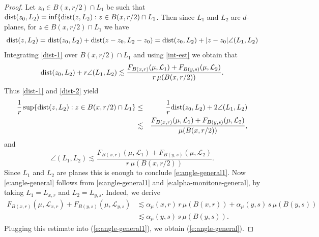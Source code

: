 \documentclass[11pt]{amsart}
\newcommand{\LL}{{\mathcal L}}
\newcommand{\dist}{{\rm dist}}
\newcommand{\rf}[1]{{(\ref{#1})}}
\theoremstyle{definition}
\theoremstyle{remark}
\numberwithin{equation}{section}
\def\lec{\lesssim}
\def\lec{\lesssim}
\begin{document}
\begin{proof}
	Let $z_0\in B(x,r/2)\cap L_1$ be such that $\dist(z_0,L_2)=\inf\{\dist(z,L_2):z\in B(x,r/2)\cap L_1$. Then since $L_1$ and $L_2$ are $d$-planes, for $z\in B(x,r/2)\cap L_1$ we have
	\begin{equation}\label{dist-1}
	\dist(z,L_2)= \dist(z_0,L_2) + \dist(z-z_0, L_2-z_0)=\dist(z_0,L_2) + |z-z_0|\angle(L_1,L_2)
		\end{equation}
	Integrating \eqref{dist-1} over $B(x,r/2)\cap  L_1$ and using \eqref{int-est} we obtain that
	\begin{equation}\label{dist-2}
\dist(z_0,L_2) + r\angle(L_1,L_2)\lesssim \frac{ F_{B(x,r)}(\mu,\LL_{1}) + F_{B(y,s)}(\mu,\LL_{2})}{r\,\mu(B(x,r/2))}.
\end{equation}
Thus \eqref{dist-1} and \eqref{dist-2} yield
	\begin{eqnarray}\label{dist-3}
	\frac{1}{r}\sup\{\dist(z,L_2):z\in B(x,r/2)\cap L_1\}&\le &\frac{1}{r}\dist(z_0,L_2) + 2\angle(L_1,L_2)\nonumber\\
	&\lesssim &\frac{ F_{B(x,r)}(\mu,\LL_{1}) + F_{B(y,s)}(\mu,\LL_{2})}{\mu(B(x,r/2))},
	\end{eqnarray}
	and 
	\begin{equation}\label{angle-1}
	\angle(L_1,L_2)\lesssim \frac{ F_{B(x,r)}(\mu,\LL_{1}) + F_{B(y,s)}(\mu,\LL_{2})}{r\,\mu(B(x,r/2))}.
	\end{equation}
	Since $L_1$ and $L_2$ are planes this is enough to conclude \eqref{e:angle-general1}.
	 Now \eqref{e:angle-general} follows from \eqref{e:angle-general1} and \eqref{e:alpha-monitone-general}, by taking $L_1= L_{x,r}$ and $L_2=L_{y,s}$.
Indeed,	we derive 
	\begin{align}\label{e:3894}
	F_{B(x,r)}(\mu,\LL_{x,r}) + F_{B(y,s)}(\mu,\LL_{y,s}) &\lec \alpha_\mu(x,r) \,r\,\mu(B(x,r))
	+ \alpha_\mu(y,s) \,s\,\mu(B(y,s))\\
	& \lec %
	 \alpha_\mu(y,s) \,s\,\mu(B(y,s)).\nonumber
	\end{align}
	Plugging this estimate into \rf{e:angle-general1}, we obtain \rf{e:angle-general}.	
\end{proof}
\end{document}
